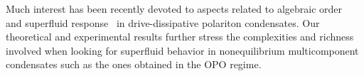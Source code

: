 Much interest has been recently devoted to aspects related to
algebraic order~\cite{Altman_2015,PhysRevX.5.041028} and superfluid
response~\cite{Keeling_2011_prl} in drive-dissipative polariton
condensates. Our theoretical and experimental results further stress
the complexities and richness involved when looking for superfluid
behavior in nonequilibrium multicomponent condensates such as the ones
obtained in the OPO regime.




